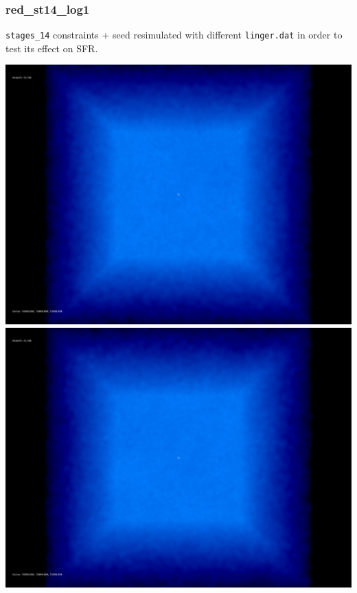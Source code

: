 \newpage

\subsubsection{red\_st14\_log1}
\texttt{stages\_14} constraints + seed resimulated with different \texttt{linger.dat} in order
to test its effect on SFR. 

\includegraphics[scale=0.1]{r256/h100/red_st14_log1/50.jpg} 
\includegraphics[scale=0.1]{r256/h100/red_st14_log1/100.jpg} \\ 
